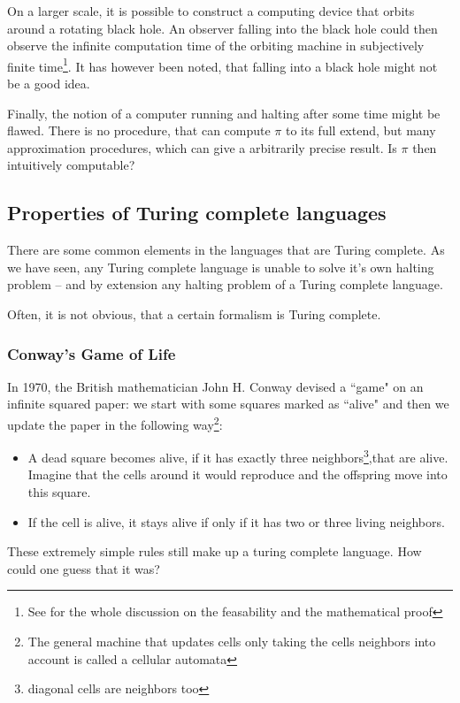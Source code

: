 On a larger scale, it is possible to construct a computing device that orbits 
around a rotating black hole. An observer falling into the black hole could 
then observe the infinite computation time of the orbiting machine in
subjectively finite time\footnote{See \cite{etesi2002blackhole} for the whole
discussion on the feasability and the mathematical proof}. It has however been
noted, that falling into a black hole might not be a good idea\citationneeded.

Finally, the notion of a computer running and halting after some time might 
be flawed. There is no procedure, that can compute $\pi$ to its full extend, 
but many approximation procedures, which can give a arbitrarily precise 
result. Is $\pi$ then intuitively computable?

\subsection{Properties of Turing complete languages}
There are some common elements in the languages that are Turing complete. As we
have seen, any Turing complete language is unable to solve it's own halting
problem -- and by extension any halting problem of a Turing complete language.

Often, it is not obvious, that a certain formalism is Turing complete.

\subsubsection{Conway's Game of Life}
In 1970, the British mathematician John H. Conway devised a ``game" on an 
infinite squared paper: we start with some squares marked as ``alive" and 
then we update the paper in the following way\footnote{The general machine 
	that updates cells only taking the cells neighbors into account is called a 
cellular automata}:

\begin{itemize}
	\item A dead square becomes alive, if it has exactly three 
		neighbors\footnote{diagonal cells are neighbors too},that 
		are alive. Imagine that the cells around it would reproduce and the 
		offspring move into this square.
	\item If the cell is alive, it stays alive if only if it has two or three 
		living neighbors.
\end{itemize}

These extremely simple rules still make up a turing complete language. How 
could one guess that it was?

